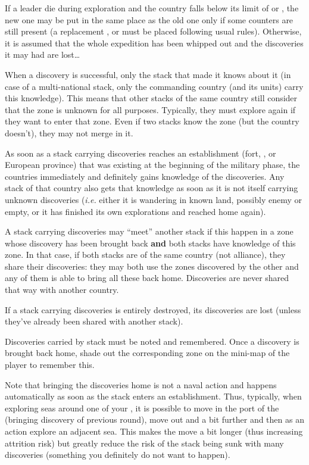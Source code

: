 If a leader die during exploration and the country falls below its limit of
\LeaderC or \LeaderE, the new one may be put in the same place as the old one
only if some counters are still present (a replacement \LeaderA, \LeaderG or
\LeaderGov must be placed following usual rules). Otherwise, it is assumed
that the whole expedition has been whipped out and the discoveries it may had
are lost\ldots

\smallskip

When a discovery is successful, only the stack that made it knows about it (in
case of a multi-national stack, only the commanding country (and its units)
carry this knowledge). This means that other stacks of the same country still
consider that the zone is unknown for all purposes. Typically, they must
explore again if they want to enter that zone. Even if two stacks know the
zone (but the country doesn't), they may not merge in it.

As soon as a stack carrying discoveries reaches an establishment (fort, \TP,
\COL or European province) that was existing at the beginning of the military
phase, the countries immediately and definitely gains knowledge of the
discoveries. Any stack of that country also gets that knowledge as soon as it
is not itself carrying unknown discoveries (\emph{i.e.} either it is wandering
in known land, possibly enemy or empty, or it has finished its own
explorations and reached home again).

A stack carrying discoveries may ``meet'' another stack if this happen in a
zone whose discovery has been brought back \textbf{and} both stacks have
knowledge of this zone. In that case, if both stacks are of the same country
(not alliance), they share their discoveries: they may both use the zones
discovered by the other and any of them is able to bring all these back
home. Discoveries are never shared that way with another country.

If a stack carrying discoveries is entirely destroyed, its discoveries are
lost (unless they've already been shared with another stack).

Discoveries carried by stack must be noted and remembered. Once a discovery is
brought back home, shade out the corresponding zone on the mini-map of the
player to remember this.

Note that bringing the discoveries home is not a naval action and happens
automatically as soon as the stack enters an establishment. Thus, typically,
when exploring seas around one of your \COL, it is possible to move in the
port of the \COL (bringing discovery of previous round), move out and a bit
further and then as an action explore an adjacent sea. This makes the move a
bit longer (thus increasing attrition risk) but greatly reduce the risk of the
stack being sunk with many discoveries (something you definitely do not want
to happen).

